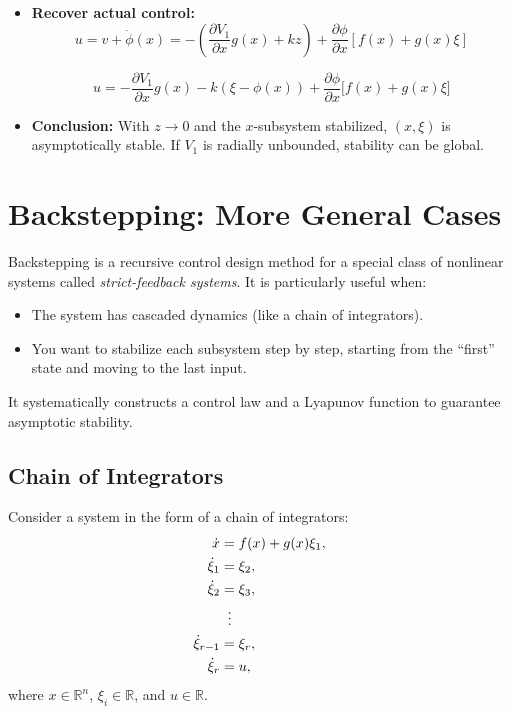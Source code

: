 \begin{itemize}
    \item \textbf{Recover actual control:}
    \begin{equation}
        u = v + \dot{\phi}(x)
          = - \left( \frac{\partial V_1}{\partial x} g(x) + k z \right) + \frac{\partial \phi}{\partial x}[f(x) + g(x)\xi]
    \end{equation}

    \begin{equation}
    \boxed{
    u = - \frac{\partial V_1}{\partial x} g(x) - k (\xi - \phi(x)) + \frac{\partial \phi}{\partial x} \big[ f(x) + g(x) \xi \big]
    }
    \end{equation}
    

    \item \textbf{Conclusion:} With $z \to 0$ and the $x$-subsystem stabilized, $(x,\xi)$ is asymptotically stable. If $V_1$ is radially unbounded, stability can be global.
\end{itemize}





\section{Backstepping: More General Cases}

Backstepping is a recursive control design method for a special class of nonlinear systems called \textit{strict-feedback systems}. It is particularly useful when:

\begin{itemize}
\item The system has cascaded dynamics (like a chain of integrators).

\item You want to stabilize each subsystem step by step, starting from the “first” state and moving to the last input.
\end{itemize}

It systematically constructs a control law and a Lyapunov function to guarantee asymptotic stability.

\subsection{Chain of Integrators}

Consider a system in the form of a chain of integrators:
\begin{align}
    \dot{x} &= f(x) + g(x)\xi_1, \\
    \dot{\xi}_1 &= \xi_2, \\
    \dot{\xi}_2 &= \xi_3, \\
    &\;\;\vdots \notag\\
    \dot{\xi}_{r-1} &= \xi_r, \\
    \dot{\xi}_r &= u,
\end{align}
where $x \in \mathbb{R}^n$, $\xi_i \in \mathbb{R}$, and $u \in \mathbb{R}$.  

